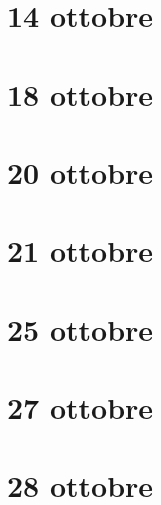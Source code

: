 \documentclass[class=article]{standalone}
\begin{document}
\newpage
\section{14 ottobre}


\newpage
\section{18 ottobre}


\newpage
\section{20 ottobre}


\newpage
\section{21 ottobre}


\newpage
\section{25 ottobre}


\newpage
\section{27 ottobre}






\newpage
\section{28 ottobre}
\end{document}
